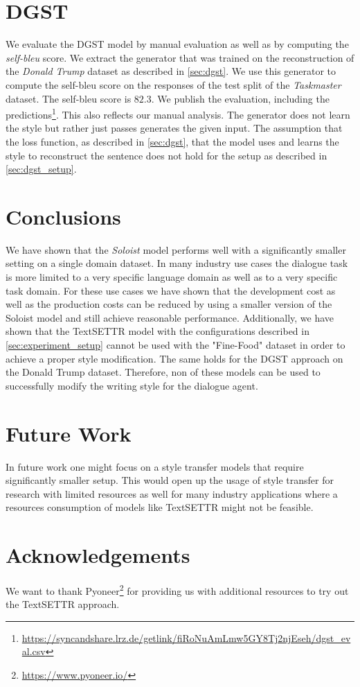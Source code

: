 \documentclass[twocolumn]{tum-article}
\begin{document}
\section{DGST}
We evaluate the DGST model by manual evaluation as well as by computing the \textit{self-bleu} score. We extract the generator that was trained on the reconstruction of the \textit{Donald Trump} dataset as described in \autoref{sec:dgst}. We use this generator to compute the self-bleu score on the responses of the test split of the \textit{Taskmaster} dataset. The self-bleu score is $82.3$. We publish the evaluation, including the predictions\footnote{\url{https://syncandshare.lrz.de/getlink/fiRoNuAmLmw5GY8Tj2njEseh/dgst_eval.csv}}. This also reflects our manual analysis. The generator does not learn the style but rather just passes generates the given input. The assumption that the loss function, as described in \autoref{sec:dgst}, that the model uses and learns the style to reconstruct the sentence does not hold for the setup as described in \autoref{sec:dgst_setup}.
\section{Conclusions}
We have shown that the \textit{Soloist} model performs well with a significantly smaller setting on a single domain dataset. In many industry use cases the dialogue task is more limited to a very specific language domain as well as to a very specific task domain. For these use cases we have shown that the development cost as well as the production costs can be reduced by using a smaller version of the Soloist model and still achieve reasonable performance. Additionally, we have shown that the TextSETTR model with the configurations described in \autoref{sec:experiment_setup} cannot be used with the "Fine-Food" dataset in order to achieve a proper style modification. The same holds for the DGST approach on the Donald Trump dataset. Therefore, non of these models can be used to successfully modify the writing style for the dialogue agent.
\section{Future Work}
In future work one might focus on a style transfer models that require significantly smaller setup. This would open up the usage of style transfer for research with limited resources as well for many industry applications where a resources consumption of models like TextSETTR might not be feasible.
\section*{Acknowledgements}
We want to thank Pyoneer\footnote{\url{https://www.pyoneer.io/}} for providing us with additional resources to try out the TextSETTR approach. 


\end{document}
